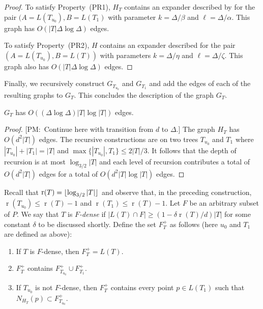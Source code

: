 \documentclass{patmorin}
\newcommand{\note}[2]{{\color{red}[#1:~#2]}}
\DeclareMathOperator{\rank}{r}
\begin{document}
\begin{proof}
  To satisfy Property~(PR1), $H_T$ contains an expander described by
   for the pair $(A=L(T_{u_0}),B=L(T_1)$ with parameter
  $k=\Delta/\beta$ and $\ell=\Delta/\alpha$.  This graph has $O(|T|\Delta\log\Delta)$ edges.

  To satisfy Property~(PR2), $H$ contains an expander described  for the pair $(A=L(T_{u_0}),B=L(T))$ with parameters $k=\Delta/\eta$ and $\ell=\Delta/\zeta$. This graph also has $O(|T|\Delta\log\Delta)$ edges.
\end{proof}

Finally, we recursively construct $G_{T_{u_0}}$ and $G_{T_1}$ and add the
edges of each of the resulting graphs to $G_{T}$. This concludes the description of the graph $G_T$.

\begin{clm}
  $G_{T}$ has $O((\Delta\log\Delta)|T|\log |T|)$ edges.
\end{clm}

\begin{proof}
  \note{PM}{Continue here with transition from $d$ to $\Delta$.}
  The graph $H_T$ has
  $O(d^2|T|)$ edges.  The recursive constructions are on two trees $T_{u_0}$
  and $T_1$ where $|T_{u_0}|+|T_1|=|T|$ and $\max\{|T_{u_0}|,T_1\}\le
  2|T|/3$. It follows that the depth of recursion is at most
  $\log_{3/2}|T|$ and each level of recursion contributes a total of
  $O(d^2|T|)$ edges for a total of $O(d^2|T|\log|T|)$ edges.
\end{proof}

Recall that $\rank(T)=\floor{\log_{3/2} |T|}$ and observe that, in
the preceding construction, $\rank(T_{u_0}) \le \rank(T)-1$ and
$\rank(T_1)\le\rank(T)-1$.  Let $F$ be an arbitrary subset of $P$.  We say
that $T$ is \emph{$F$-dense} if $|L(T)\cap F|\ge (1-\delta\rank(T)/d)|T|$
for some constant $\delta$ to be discussed shortly.  Define the set
$F^+_T$ as follows (here $u_0$ and $T_1$ are defined as above):

\begin{enumerate}
  \item If $T$ is $F$-dense, then $F^+_T=L(T)$.
  \item $F^+_T$ contains $F^+_{T_{u_0}}\cup F^+_{T_1}$.
  \item If $T_{u_0}$ is not $F$-dense, then $F^+_T$ contains every point $p\in L(T_1)$ such that $N_{H_T}(p)\subset F^+_{T_{u_0}}$.
\end{enumerate}
\end{document}
